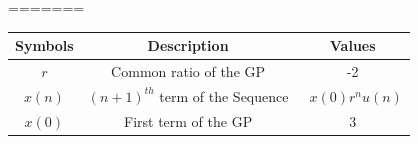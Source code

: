 \documentclass[journal,12pt,onecolumn]{IEEEtran}
\theoremstyle{remark}
\begin{document}
=======
\vspace{0.5cm}
\begin{enumerate}
\begin{tabular}{ |c|c|c| } 
 \hline
Symbols & Description & Values  \\
\hline
 $r$ & Common ratio of the GP & -2\\
 \hline

  $x(n)$ & $(n+1)^{th}$ term of the Sequence & \ $x(0)r^{n}u(n)$\\
  \hline


  $x(0)$ & First term of the GP & 3\\
\hline
  
   \hline
\end{tabular}
\end{enumerate}
\centering
\captionsetup{Table 1 : Parameters , Descriptions And Values }
\label{table:ee25-tab2}
\vspace{0.5cm}
\end{document}
